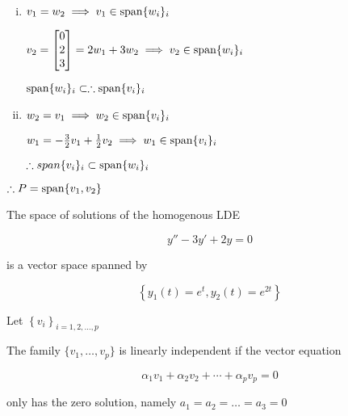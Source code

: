 \begin{example}
	\begin{enumerate}[i)]
		\item $v_1=w_2\implies v_1\in \mathrm{span}\{w_i\}_i$
		
		$v_2=\begin{bmatrix}
			0\\2\\3
		\end{bmatrix}=2w_1+3w_2\implies v_2\in\mathrm{span}\{w_i\}_i$

		$\mathrm{span}\{w_i\}_i \subset \therefore \mathrm{span}\{v_i\}_i$

		\item $w_2=v_1\implies w_2\in\mathrm{span}\{v_i\}_i$
		
		$w_1=-\frac{3}{2}v_1+\frac{1}{2}v_2\implies w_1\in\mathrm{span}\{v_i\}_i$

		$\therefore {span}\{v_i\}_i \subset \mathrm{span}\{w_i\}_i$
	\end{enumerate}

	$\therefore P = \mathrm{span}\{v_1, v_2\}$
\end{example}

\begin{example}
	The space of solutions of the homogenous LDE

	\begin{equation} \label{eq:span-ex-LDE}
		y''-3y'+2y=0
	\end{equation}

	is a vector space spanned by 

	\begin{equation} \label{eq:span-ex-LDE-span}
		\left\{y_1(t)=e^t, y_2(t) = e^{2t}\right\}
	\end{equation}
\end{example}

\begin{definition}
	Let $\left\{v_i\right\}_{i=1,2,\ldots,p}$

	The family $\{v_1, \ldots, v_p\}$ is linearly independent if the vector equation

	\begin{equation} \label{eq:lin-ind}
		\alpha_1 v_1 + \alpha_2 v_2 + \cdots + \alpha_p v_p = 0
	\end{equation}

	only has the zero solution, namely $a_1=a_2=\ldots=a_3=0$
\end{definition}

